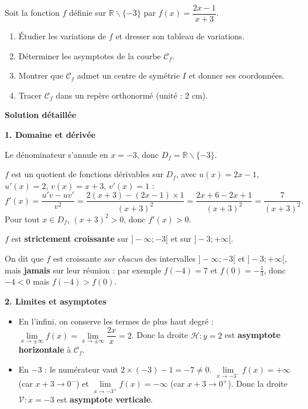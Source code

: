\documentclass[11pt]{article}
\def\setminus{\mathbin{\backslash}}\let\smallsetminus\setminus
\begin{document}
\begin{exoresolu}[Étude de $f(x)=\dfrac{2x-1}{x+3}$ et tracé de $\mathcal{C}_f$]
Soit la fonction $f$ définie sur $\mathbb{R}\setminus\{-3\}$ par $f(x)=\dfrac{2x-1}{x+3}$.
\begin{enumerate}
    \item Étudier les variations de $f$ et dresser son tableau de variations.
    \item Déterminer les asymptotes de la courbe $\mathcal{C}_f$.
    \item Montrer que $\mathcal{C}_f$ admet un centre de symétrie $I$ et donner ses coordonnées.
    \item Tracer $\mathcal{C}_f$ dans un repère orthonormé (unité : 2 cm).
\end{enumerate}
\tcblower
\textbf{Solution détaillée}

\textbf{1. Domaine et dérivée}

Le dénominateur s'annule en $x=-3$, donc $D_f = \mathbb{R}\setminus\{-3\}$.

$f$ est un quotient de fonctions dérivables sur $D_f$, avec $u(x)=2x-1$, $u'(x)=2$, $v(x)=x+3$, $v'(x)=1$ :
\[ f'(x) = \frac{u'v-uv'}{v^2} = \frac{2(x+3) - (2x-1)\times 1}{(x+3)^2} = \frac{2x+6-2x+1}{(x+3)^2} = \frac{7}{(x+3)^2}. \]
Pour tout $x\in D_f$, $(x+3)^2 > 0$, donc $f'(x) > 0$.

$f$ est \textbf{strictement croissante} sur $]-\infty;-3[$ et sur $]-3;+\infty[$.

\begin{attention}
On dit que $f$ est croissante \emph{sur chacun} des intervalles $]-\infty;-3[$ et $]-3;+\infty[$, mais \textbf{jamais} sur leur réunion : par exemple $f(-4)=7$ et $f(0)=-\tfrac13$, donc $-4<0$ mais $f(-4)>f(0)$.
\end{attention}

\textbf{2. Limites et asymptotes}
\begin{itemize}
    \item En l'infini, on conserve les termes de plus haut degré : $\lim\limits_{x\to \pm\infty}f(x) = \lim\limits_{x\to \pm\infty}\dfrac{2x}{x} = 2$. Donc la droite $\mathcal{H} : y = 2$ est \textbf{asymptote horizontale} à $\mathcal{C}_f$.
    \item En $-3$ : le numérateur vaut $2\times(-3)-1=-7\neq 0$. $\lim\limits_{x\to -3^-}f(x) = +\infty$ (car $x+3\to 0^-$) et $\lim\limits_{x\to -3^+}f(x) = -\infty$ (car $x+3\to 0^+$). Donc la droite $\mathcal{V} : x = -3$ est \textbf{asymptote verticale}.
\end{itemize}


\end{exoresolu}
\end{document}

